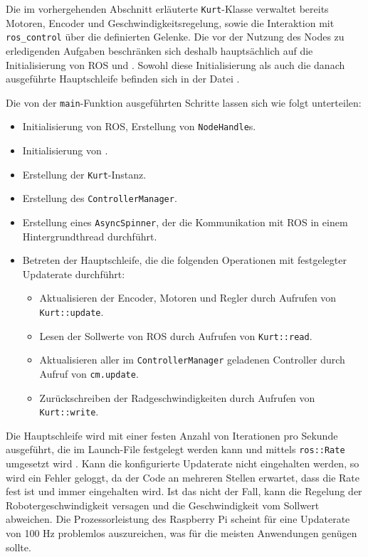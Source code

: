 \documentclass[german]{thesis_KBS}
\newcommand{\code}[1]{\texttt{#1}}  %
\begin{document}
Die im vorhergehenden Abschnitt erläuterte \code{Kurt}-Klasse verwaltet bereits
Motoren, Encoder und Geschwindigkeitsregelung, sowie die Interaktion mit
\code{ros\_control} über die definierten Gelenke. Die vor der Nutzung des Nodes
zu erledigenden Aufgaben beschränken sich deshalb hauptsächlich auf die
Initialisierung von ROS und \pigpio{}. Sowohl diese Initialisierung als auch die
danach ausgeführte Hauptschleife befinden sich in der Datei .

Die von der \code{main}-Funktion ausgeführten Schritte lassen sich wie folgt
unterteilen:

\begin{itemize}
    \item Initialisierung von ROS, Erstellung von \code{NodeHandle}s.
    \item Initialisierung von \pigpio{}.
    \item Erstellung der \code{Kurt}-Instanz.
    \item Erstellung des \code{ControllerManager}.
    \item Erstellung eines \code{AsyncSpinner}, der die Kommunikation mit ROS
        in einem Hintergrundthread durchführt.
    \item Betreten der Hauptschleife, die die folgenden Operationen mit
        festgelegter Updaterate durchführt:

    \begin{itemize}
        \item Aktualisieren der Encoder, Motoren und Regler durch Aufrufen von
            \code{Kurt::update}.
        \item Lesen der Sollwerte von ROS durch Aufrufen von \code{Kurt::read}.
        \item Aktualisieren aller im \code{ControllerManager} geladenen
            Controller durch Aufruf von \code{cm.update}.
        \item Zurückschreiben der Radgeschwindigkeiten durch Aufrufen von
            \code{Kurt::write}.
    \end{itemize}
\end{itemize}

Die Hauptschleife wird mit einer festen Anzahl von Iterationen pro Sekunde
ausgeführt, die im Launch-File festgelegt werden kann und mittels
\code{ros::Rate} umgesetzt wird \cite{ros-rate-doxygen}. Kann die konfigurierte
Updaterate nicht eingehalten werden, so wird ein Fehler geloggt, da der Code an
mehreren Stellen erwartet, dass die Rate fest ist und immer eingehalten wird.
Ist das nicht der Fall, kann die Regelung der Robotergeschwindigkeit versagen
und die Geschwindigkeit vom Sollwert abweichen. Die Prozessorleistung des
Raspberry Pi scheint für eine Updaterate von 100 Hz problemlos auszureichen, was
für die meisten Anwendungen genügen sollte.
\end{document}
